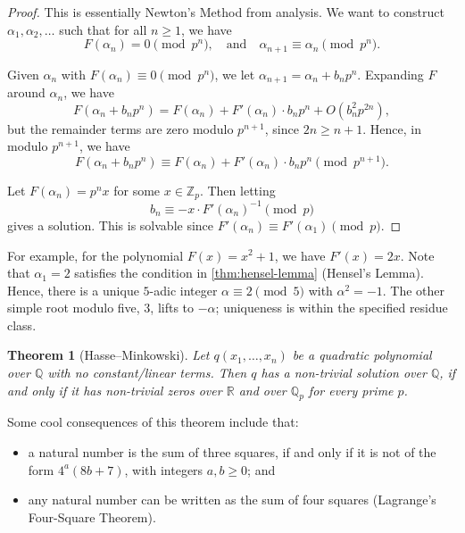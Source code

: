 \documentclass{article}
\newtheorem{theorem}{Theorem}[section]
\theoremstyle{definition}
\theoremstyle{remark}
\newcommand{\pqty}[1]{\left(#1\right)}
\newcommand{\qand}{\quad\text{and}\quad}
\newcommand{\inverse}{^{-1}}
\newcommand{\bigO}{O}
\newcommand{\ZZ}{\mathbb{Z}}
\newcommand{\QQ}{\mathbb{Q}}
\newcommand{\RR}{\mathbb{R}}
\begin{document}
\begin{proof}
    This is essentially Newton's Method from analysis. We want to construct \(\alpha_1, \alpha_2, \ldots\) such that for all \(n \geq 1\), we have
    \[
        F\pqty{\alpha_n} = 0 \pmod{p^n}, \qand \alpha_{n + 1} \equiv \alpha_n \pmod{p^n}.
    \]

    Given \(\alpha_n\) with \(F\pqty{\alpha_n} \equiv 0 \pmod{p^n}\), we let \(\alpha_{n + 1} = \alpha_n + b_n p^n\). Expanding \(F\) around \(\alpha_n\), we have
    \[
        F\pqty{\alpha_n + b_n p^n} = F\pqty{\alpha_n} + F'\pqty{\alpha_n} \cdot b_n p^n + \bigO\pqty{b_n^2 p^{2n}},
    \]
    but the remainder terms are zero modulo \(p^{n + 1}\), since \(2n \geq n + 1\). Hence, in modulo \(p^{n + 1}\), we have
    \[
        F\pqty{\alpha_n + b_n p^n} \equiv F\pqty{\alpha_n} + F'\pqty{\alpha_n} \cdot b_n p^n \pmod{p^{n + 1}}.
    \]

    Let \(F\pqty{\alpha_n} = p^n x\) for some \(x \in \ZZ_p\). Then letting
    \[
        b_n \equiv -x \cdot F'\pqty{\alpha_n}\inverse \pmod{p}
    \]
    gives a solution. This is solvable since \(F'\pqty{\alpha_n} \equiv F'\pqty{\alpha_1} \pmod{p}\).
\end{proof}

For example, for the polynomial \(F\pqty{x} = x^2 + 1\), we have \(F'\pqty{x} = 2x\). Note that \(\alpha_1 = 2\) satisfies the condition in \autoref{thm:hensel-lemma} (Hensel's Lemma). Hence, there is a unique \(5\)-adic integer \(\alpha\equiv2\pmod5\) with \(\alpha^2=-1\). The other simple root modulo five, \(3\), lifts to \(-\alpha\); uniqueness is within the specified residue class.

\begin{theorem}[Hasse--Minkowski]
    \label{thm:hasse-minkowski}%
    Let \(q\pqty{x_1, \ldots, x_n}\) be a quadratic polynomial over \(\QQ\) with no constant/linear terms. Then \(q\) has a non-trivial solution over \(\QQ\), if and only if it has non-trivial zeros over \(\RR\) and over \(\QQ_p\) for every prime \(p\).
\end{theorem}

Some cool consequences of this theorem include that:
\begin{itemize}
    \item a natural number is the sum of three squares, if and only if it is not of the form \(4^a(8b+7)\), with integers \(a,b\geq0\); and
    \item any natural number can be written as the sum of four squares (Lagrange's Four-Square Theorem).
\end{itemize} 
\end{document}
